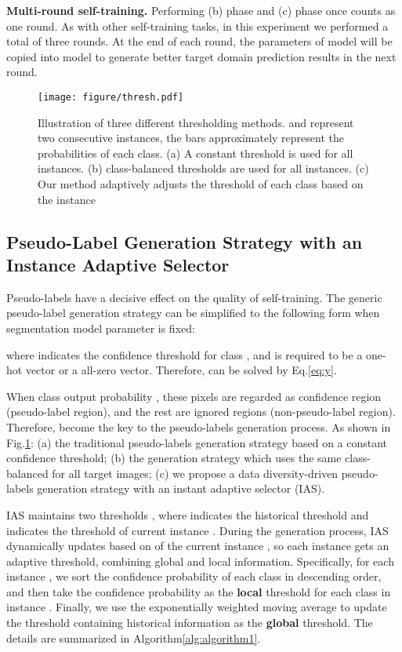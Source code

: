 \documentclass[runningheads]{llncs}
\begin{document}
\noindent\textbf{Multi-round self-training.} Performing (b) phase and (c) phase once counts as one round. As with other self-training tasks, in this experiment we performed a total of three rounds. At the end of each round, the parameters of model  will be copied into model  to generate better target domain prediction results in the next round.


\begin{figure}[ht] 
    \centering 
    \texttt{[image: figure/thresh.pdf]} 
    \caption{Illustration of three different thresholding methods.  and  represent two consecutive instances, the bars approximately represent the probabilities of each class. (a) A constant threshold is used for all instances. (b)  class-balanced thresholds are used for all instances. (c) Our method adaptively adjusts the threshold of each class based on the instance}
    \label{fig:pseudo-methods} 
\end{figure}


\subsection{Pseudo-Label Generation Strategy with an Instance Adaptive Selector} \label{subsection:p}


 Pseudo-labels  have a decisive effect on the quality of self-training. The generic pseudo-label generation strategy can be simplified to the following form when segmentation model parameter  is fixed:


where  indicates the confidence threshold for class , and  is required to be a one-hot vector or a all-zero vector. Therefore,  can be solved by Eq.\eqref{eq:y}.




When class  output probability , these pixels are regarded as confidence region (pseudo-label region), and the rest are ignored regions (non-pseudo-label region). Therefore,  become the key to the pseudo-labels generation process. As shown in Fig.\ref{fig:pseudo-methods}: (a) the traditional pseudo-labels generation strategy based on a constant confidence threshold; (b) the generation strategy which uses the same class-balanced  for all target images; (c) we propose a data diversity-driven pseudo-labels generation strategy with an instant adaptive selector (IAS).


IAS maintains two thresholds , where  indicates the historical threshold and  indicates the threshold of current instance . During the generation process, IAS dynamically updates   based on   of the current instance , so each instance gets an adaptive threshold, combining global and local information. Specifically, for each instance , we  sort the confidence probability of each class in descending order, and then take the  confidence probability as the \textbf{local} threshold  for each class in instance . Finally, we use the exponentially weighted moving average to update the threshold  containing historical information as the \textbf{global} threshold. The details are summarized in Algorithm\ref{alg:algorithm1}.
\end{document}
